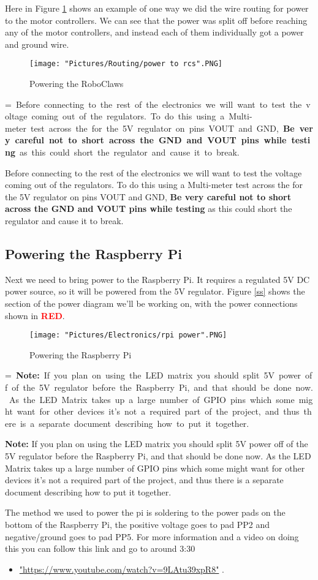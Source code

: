\documentclass[12pt]{article}
\makeatletter
\newcommand{\mybox}[1]{%
  \setbox0=\hbox{#1}%
  \setlength{\@tempdima}{\dimexpr\wd0+13pt}%
  \begin{tcolorbox}[colframe=mycolor,boxrule=0.5pt,arc=4pt,
      left=6pt,right=6pt,top=6pt,bottom=6pt,boxsep=0pt,width=0.95\textwidth]
    #1
  \end{tcolorbox}
}
\makeatother
\begin{document}
\noindent Here in Figure \ref{vm2rcs} shows an example of one way we did the wire routing for power to the motor controllers. We can see that the power was split off before reaching any of the motor controllers, and instead each of them individually got a power and ground wire. 

\begin{figure}[H]
  	\centering
    	\texttt{[image: "Pictures/Routing/power to rcs".PNG]}
 	\caption{Powering the RoboClaws}
	\label{vm2rcs}
\end{figure}


\mybox{
Before connecting to the rest of the electronics we will want to test the voltage coming out of the regulators. To do this using a Multi-meter test across the  for the 5V regulator on pins VOUT and GND, \textbf{Be very careful not to short across the GND and VOUT pins while testing} as this could short the regulator and cause it to break.
}

\subsection{Powering the Raspberry Pi}
Next we need to bring power to the Raspberry Pi. It requires a regulated 5V DC power source, so it will be powered from the 5V regulator. Figure \ref{ss} shows the section of the power diagram we'll be working on, with the power connections shown in \textcolor{red}{\textbf{RED}}.

\begin{figure}[H]
  	\centering
    	\texttt{[image: "Pictures/Electronics/rpi power".PNG]}
 	\caption{Powering the Raspberry Pi}
	\label{rpi power}
\end{figure}

\mybox{
\textbf{Note:} If you plan on using the LED matrix you should split 5V power off of the 5V regulator before the Raspberry Pi, and that should be done now. As the LED Matrix takes up a large number of GPIO pins which some might want for other devices it's not a required part of the project, and thus there is a separate document describing how to put it together.
} 


\noindent The method we used to power the pi is soldering to the power pads on the bottom of the Raspberry Pi, the positive voltage goes to pad PP2 and negative/ground goes to pad PP5. For more information and a video on doing this you can follow this link and go to around 3:30 
\begin{itemize}
	\item \href{"https://www.youtube.com/watch?v=9LAtu39xpR8"}{"https://www.youtube.com/watch?v=9LAtu39xpR8"} . 
\end{itemize}
\end{document}
